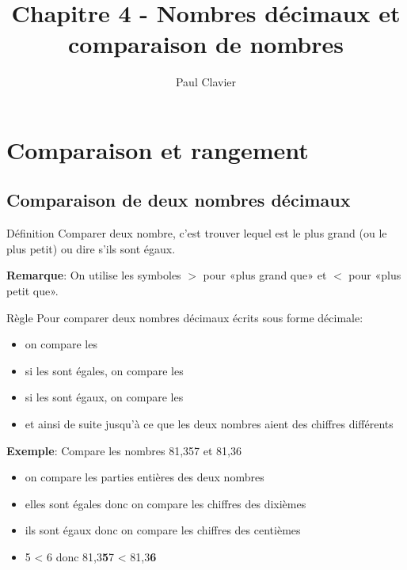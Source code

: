 \documentclass[12pt,a4paper]{article}
\author{Paul Clavier}
\title{Chapitre 4 - Nombres décimaux et comparaison de nombres}
\begin{document}
\renewcommand\thesection{\Roman{section}}
\renewcommand\thesubsection{\arabic{subsection}}


\ifdefined\isprof
	\TeacherModeOn
\fi




\begin{center}
\end{center}

\section{Comparaison et rangement}

\subsection{Comparaison de deux nombres décimaux}

\begin{definition}{Définition}
Comparer deux nombre, c'est trouver lequel est le plus grand (ou le plus petit) ou dire s'ils sont égaux.
\end{definition}

\textbf{Remarque}: On utilise les symboles $>$ pour «plus grand que» et $<$ pour «plus petit que». 

\begin{definition}{Règle}
Pour comparer deux nombres décimaux écrits sous forme décimale:
\begin{itemize}
\item on compare les 
\item si les  sont égales, on compare les 
\item si les  sont égaux, on compare les 
\item et ainsi de suite jusqu'à ce que les deux nombres aient des chiffres différents
\end{itemize}
\end{definition}

\textbf{Exemple}: Compare les nombres 81,357 et 81,36
\begin{itemize}
\item on compare les parties entières des deux nombres
\item elles sont égales donc on compare les chiffres des dixièmes
\item ils sont égaux donc on compare les chiffres des centièmes
\item 5 < 6 donc 81,3\textbf{5}7 < 81,3\textbf{6}
\end{itemize} 
\end{document}
